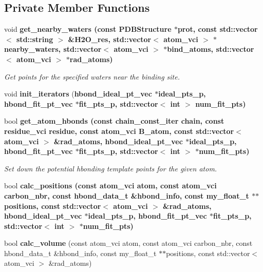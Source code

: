 \subsection*{Private Member Functions}
\begin{CompactItemize}
\item 
void \bf{get\_\-nearby\_\-waters} (const \bf{PDBStructure} $\ast$prot, const std::vector$<$ std::string $>$ \&H2O\_\-res, std::vector$<$ atom\_\-vci $>$ $\ast$nearby\_\-waters, std::vector$<$ atom\_\-vci $>$ $\ast$bind\_\-atoms, std::vector$<$ atom\_\-vci $>$ $\ast$rad\_\-atoms)
\begin{CompactList}\small\item\em Get points for the specified waters near the binding site. \item\end{CompactList}\item 
void \textbf{init\_\-iterators} (\bf{hbond\_\-ideal\_\-pt\_\-vec} $\ast$ideal\_\-pts\_\-p, \bf{hbond\_\-fit\_\-pt\_\-vec} $\ast$fit\_\-pts\_\-p, std::vector$<$ int $>$ num\_\-fit\_\-pts)\label{classASCbase_1_1HbondPoints_7409a5ed54b6b5a1091ec470222d8fff}

\item 
bool \bf{get\_\-atom\_\-hbonds} (const chain\_\-const\_\-iter chain, const residue\_\-vci residue, const atom\_\-vci B\_\-atom, const std::vector$<$ atom\_\-vci $>$ \&rad\_\-atoms, \bf{hbond\_\-ideal\_\-pt\_\-vec} $\ast$ideal\_\-pts\_\-p, \bf{hbond\_\-fit\_\-pt\_\-vec} $\ast$fit\_\-pts\_\-p, std::vector$<$ int $>$ $\ast$num\_\-fit\_\-pts)
\begin{CompactList}\small\item\em Set down the potential hbonding template points for the given atom. \item\end{CompactList}\item 
bool \bf{calc\_\-positions} (const atom\_\-vci atom, const atom\_\-vci carbon\_\-nbr, const hbond\_\-data\_\-t \&hbond\_\-info, const my\_\-float\_\-t $\ast$$\ast$positions, const std::vector$<$ atom\_\-vci $>$ \&rad\_\-atoms, \bf{hbond\_\-ideal\_\-pt\_\-vec} $\ast$ideal\_\-pts\_\-p, \bf{hbond\_\-fit\_\-pt\_\-vec} $\ast$fit\_\-pts\_\-p, std::vector$<$ int $>$ $\ast$num\_\-fit\_\-pts)
\item 
bool \textbf{calc\_\-volume} (const atom\_\-vci atom, const atom\_\-vci carbon\_\-nbr, const hbond\_\-data\_\-t \&hbond\_\-info, const my\_\-float\_\-t $\ast$$\ast$positions, const std::vector$<$ atom\_\-vci $>$ \&rad\_\-atoms)\label{classASCbase_1_1HbondPoints_68b193317365c110b4f395b82f918ec5}


\end{CompactItemize}
